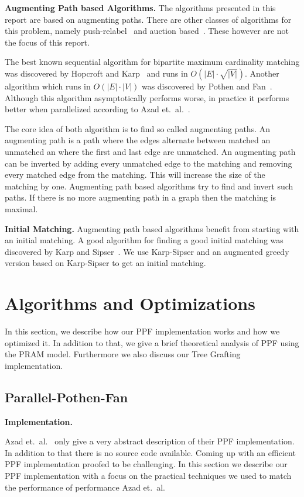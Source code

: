 \documentclass[letterpaper]{article}
\newcommand{\mypar}[1]{{\bf #1.}}
\begin{document}
\mypar{Augmenting Path based Algorithms}
The algorithms presented in this report are based on augmenting paths. 
There are other classes of algorithms for this problem, namely push-relabel~\cite{GoldbergT88} and auction based~\cite{Bertsekas}. 
These however are not the focus of this report. 

The best known sequential algorithm for bipartite maximum cardinality matching was discovered by Hopcroft and Karp~\cite{HK:1973}
and runs in $O(|E|\cdot \sqrt{|V|})$. Another algorithm which runs in $O(|E|\cdot|V|)$ was discovered by Pothen and Fan~\cite{Pothen:1990}.
Although this algorithm asymptotically performs worse, in practice it performs better when parallelized according to Azad et.\ al.~\cite{Azad:2012}.

The core idea of both algorithm is to find so called augmenting paths. An augmenting path is a path where the edges alternate between matched an unmatched an where the first 
and last edge are unmatched. An augmenting path can be inverted by adding every unmatched edge to the matching and removing every matched edge from the matching. 
This will increase the size of the matching by one. 
Augmenting path based algorithms try to find and invert such paths. If there is no more augmenting path in a graph then the matching is maximal.

\mypar{Initial Matching}
Augmenting path based algorithms benefit from starting with an initial matching. 
A good algorithm for finding a good initial matching was discovered by Karp and Sipser~\cite{KarpS81}.
We use Karp-Sipser and an augmented greedy version based on Karp-Sipser to get an initial matching. 

\section{Algorithms and Optimizations}\label{sec:pfopt}

In this section, we describe how our PPF implementation works and how we optimized it. In addition to that, we 
give a brief theoretical analysis of PPF using the PRAM model. Furthermore we also discuss our Tree Grafting implementation.

\subsection{Parallel-Pothen-Fan}\label{sec:pf}

\mypar{Implementation}

Azad et.\ al.~\cite{Azad:2012} only give a very abstract description of their PPF implementation. In addition to that there is no source code available. 
Coming up with an efficient PPF implementation proofed to be challenging. 
In this section we describe our PPF implementation with a focus on the practical techniques we used to match the performance of performance Azad et.\ al.\\
\end{document}
